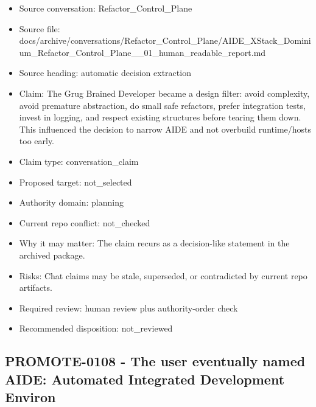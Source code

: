 \documentclass[11pt,a4paper]{report}
\begin{document}
\begin{itemize}
\item Source conversation: Refactor\_Control\_Plane
\item Source file: docs/archive/conversations/Refactor\_Control\_Plane/AIDE\_XStack\_Dominium\_Refactor\_Control\_Plane\_\_01\_human\_readable\_report.md
\item Source heading: automatic decision extraction
\item Claim: The Grug Brained Developer became a design filter: avoid complexity, avoid premature abstraction, do small safe refactors, prefer integration tests, invest in logging, and respect existing structures before tearing them down. This influenced the decision to narrow AIDE and not overbuild runtime/hosts too early.
\item Claim type: conversation\_claim
\item Proposed target: not\_selected
\item Authority domain: planning
\item Current repo conflict: not\_checked
\item Why it may matter: The claim recurs as a decision-like statement in the archived package.
\item Risks: Chat claims may be stale, superseded, or contradicted by current repo artifacts.
\item Required review: human review plus authority-order check
\item Recommended disposition: not\_reviewed
\end{itemize}

\subsection{PROMOTE-0108 - The user eventually named AIDE: Automated Integrated Development Environ}
\end{document}
